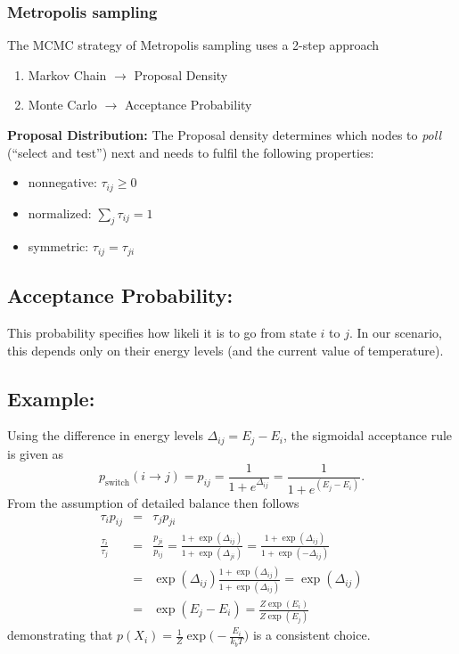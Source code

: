 \begin{frame}\frametitle{Metropolis sampling}
\label{sec:metropolis-sampling}
The MCMC strategy of Metropolis sampling uses a 2-step approach
\begin{enumerate}
\item Markov Chain $\rightarrow$   Proposal Density
\item Monte Carlo $\rightarrow$   Acceptance Probability
\end{enumerate}

\textbf{Proposal Distribution:}
The Proposal density determines which nodes to \emph{poll} (``select
and test'') next and needs to fulfil the following properties:
\begin{itemize}
\item nonnegative: $\tau_{ij} \geq 0$ 
\item normalized: $\sum_j \tau_{ij} =1$ 
\item symmetric: $\tau_{ij}=\tau_{ji}$
\end{itemize}

\end{frame}

\newpage

\subsection{Acceptance Probability:}
This probability specifies how likeli it is to go from state $i$ to
$j$. In our scenario, this depends only on their energy levels (and the current value of
temperature).

\subsection{Example:} Using the difference in energy levels 
$\Delta_{ij} = E_j -E_i$, the sigmoidal acceptance rule is given as
$$
p_\mathrm{switch}(i \rightarrow j) = p_{ij} = \frac{1}{1+e^{\Delta_{ij}}} = \frac{1}{1+e^{(E_j -E_i)}}.
$$
From the assumption of detailed balance then follows
\begin{eqnarray*}
  \tau_i p_{ij} & = & \tau_j p_{ji}\\
  \frac{\tau_i}{\tau_j}& = &  \frac{p_{ji}}{ p_{ij}} 
= \frac{1+\exp(\Delta_{ij})}{1+\exp(\Delta_{ji})}
= \frac{1+\exp(\Delta_{ij})}{1+\exp(-\Delta_{ij})}\\
& = & \exp(\Delta_{ij}) \frac{1+\exp(\Delta_{ij})}{1+\exp(\Delta_{ij})}
= \exp(\Delta_{ij})\\
&= &\exp(E_j-E_i) = \frac{Z \exp(E_i)}{Z \exp(E_j)}
\end{eqnarray*}
demonstrating that 
$p(X_i)= \frac{1}{Z} \exp \big(-\frac{E_i}{k_b T}\big)$
is a consistent choice. 
\\

